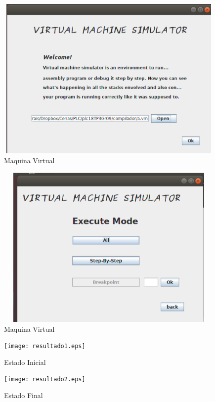 \documentclass{report}
\begin{document}
\begin{figure}[ht]
	\centering
	\includegraphics[width=14cm,height= 8cm]{vm2.eps}
	\caption{Maquina Virtual}
	\label{vm2}
\end{figure}

\begin{figure}[ht]
	\centering
	\includegraphics[width=14cm,height= 8cm]{vm3.eps}
	\caption{Maquina Virtual}
	\label{vm3}
\end{figure}

\begin{figure}[ht]
	\centering
	\texttt{[image: resultado1.eps]}
	\caption{Estado Inicial}
	\label{Resutado1}
\end{figure}

\begin{figure}[ht]
	\centering
	\texttt{[image: resultado2.eps]}
	\caption{Estado Final}
	\label{Resultado2}
\end{figure}
\end{document}
